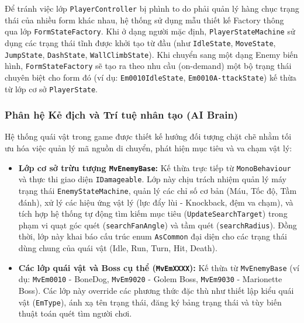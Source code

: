 \documentclass[../DoAn.tex]{subfiles}
\begin{document}
Để tránh việc lớp \texttt{PlayerController} bị phình to do phải quản lý hàng chục trạng thái của nhiều form khác nhau, hệ thống sử dụng mẫu thiết kế Factory thông qua lớp \texttt{FormStateFactory}. Khi ở dạng người mặc định, \texttt{PlayerStateMachine} sử dụng các trạng thái tĩnh được khởi tạo từ đầu (như \texttt{IdleState}, \texttt{MoveState}, \texttt{JumpState}, \texttt{DashState}, \texttt{WallClimbState}). Khi chuyển sang một dạng Enemy biến hình, \texttt{FormStateFactory} sẽ tạo ra theo nhu cầu (on-demand) một bộ trạng thái chuyên biệt cho form đó (ví dụ: \texttt{Em0010IdleState}, \texttt{Em0010A-ttackState}) kế thừa từ lớp cơ sở \texttt{PlayerState}.

\subsubsection{Phân hệ Kẻ địch và Trí tuệ nhân tạo (AI Brain)}
Hệ thống quái vật trong game được thiết kế hướng đối tượng chặt chẽ nhằm tối ưu hóa việc quản lý mã nguồn di chuyển, phát hiện mục tiêu và va chạm vật lý:
\begin{itemize}
    \item \textbf{Lớp cơ sở trừu tượng \texttt{MvEnemyBase}:} Kế thừa trực tiếp từ \texttt{MonoBehaviour} và thực thi giao diện \texttt{IDamageable}. Lớp này chịu trách nhiệm quản lý máy trạng thái \texttt{EnemyStateMachine}, quản lý các chỉ số cơ bản (Máu, Tốc độ, Tầm đánh), xử lý các hiệu ứng vật lý (lực đẩy lùi - Knockback, đệm va chạm), và tích hợp hệ thống tự động tìm kiếm mục tiêu (\texttt{UpdateSearchTarget}) trong phạm vi quạt góc quét (\texttt{searchFanAngle}) và tầm quét (\texttt{searchRadius}). Đồng thời, lớp này khai báo cấu trúc enum \texttt{AsCommon} đại diện cho các trạng thái dùng chung của quái vật (Idle, Run, Turn, Hit, Death).
    \item \textbf{Các lớp quái vật và Boss cụ thể (\texttt{MvEmXXXX}):} Kế thừa từ \texttt{MvEnemyBase} (ví dụ: \texttt{MvEm0010} - BoneDog, \texttt{MvEm9020} - Golem Boss, \texttt{MvEm9030} - Marionette Boss). Các lớp này override các phương thức đặc thù như thiết lập kiểu quái vật (\texttt{EmType}), ánh xạ tên trạng thái, đăng ký bảng trạng thái và tùy biến thuật toán quét tìm người chơi.
\end{itemize}
\end{document}
